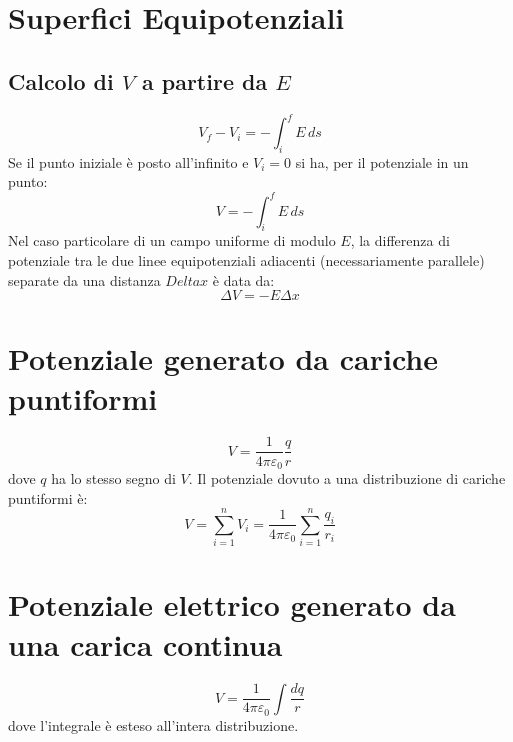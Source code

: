         \section*{Superfici Equipotenziali}
            \subsection*{Calcolo di $V$ a partire da $E$}
                \begin{equation*}
                    V_f - V_i = - \int_{i}^{f} E \,ds
                \end{equation*}
            Se il punto iniziale è posto all'infinito e $V_i = 0$ si ha, per il
            potenziale in un punto:
                \begin{equation*}
                    V = -\int_{i}^{f} E \,ds
                \end{equation*}
            Nel caso particolare di un campo uniforme di modulo $E$, la 
            differenza di potenziale tra le due linee equipotenziali adiacenti
            (necessariamente parallele) separate da una distanza $Delta x$ è 
            data da:
                \begin{equation*}
                    \Delta V = -E\Delta x
                \end{equation*}

        \section*{Potenziale generato da cariche puntiformi}
            \begin{equation*}
                V = \frac{1}{4\pi\varepsilon_0}\frac{q}{r}
            \end{equation*}
        dove $q$ ha lo stesso segno di $V$. Il potenziale dovuto a una 
        distribuzione di cariche puntiformi è:
            \begin{equation*}
                V = \sum_{i = 1}^{n}V_i = \frac{1}{4\pi\varepsilon_0}
                \sum_{i = 1}^{n}\frac{q_i}{r_i}
            \end{equation*}

        \section*{Potenziale elettrico generato da una carica continua}
            \begin{equation*}
                V = \frac{1}{4\pi\varepsilon_0}\int \frac{dq}{r}
            \end{equation*}
        dove l'integrale è esteso all'intera distribuzione.


